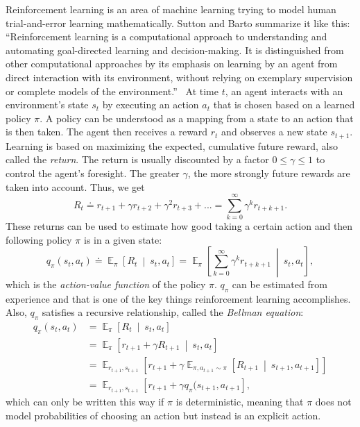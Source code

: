 \documentclass[a4paper,titlepage]{article}
\DeclareMathOperator{\Expectation}{\mathbb{E}}
\newcommand{\Exp}[3]{\Expectation_{#1} \left[ #2 \ \middle| \ #3 \right]}
\newcommand{\Ex}[2]{\Expectation_{#1} \left[ #2 \right]}
\begin{document}
Reinforcement learning is an area of machine learning trying to model human trial-and-error learning mathematically. Sutton and Barto summarize it like this: ``Reinforcement learning is a computational approach to understanding and automating goal-directed learning and decision-making. It is distinguished from other computational approaches by its emphasis on learning by an agent from direct interaction with its environment, without relying on exemplary supervision or complete models of the environment.''~\cite[p.~15]{book} At time $t$, an agent interacts with an environment's state $s_t$ by executing an action $a_t$ that is chosen based on a learned policy $\pi$. A policy can be understood as a mapping from a state to an action that is then taken. The agent then receives a reward $r_t$ and observes a new state $s_{t+1}$. Learning is based on maximizing the expected, cumulative future reward, also called the \emph{return}. The return is usually discounted by a factor $0 \leq \gamma \leq 1$ to control the agent's foresight. The greater $\gamma$, the more strongly future rewards are taken into account. Thus, we get
\begin{equation*}
  R_t \doteq r_{t+1} + \gamma r_{t+2} + \gamma^2 r_{t+3} + ... = \sum_{k = 0}^{\infty} \gamma^k r_{t+k+1}.
\end{equation*}
These returns can be used to estimate how good taking a certain action and then following policy $\pi$ is in a given state:
\begin{equation*}
  q_\pi(s_t, a_t) \doteq \Exp{\pi}{R_t}{s_t, a_t} = \Exp{\pi}{\sum_{k = 0}^{\infty} \gamma^k r_{t+k+1}}{s_t, a_t},
\end{equation*}
which is the \emph{action-value function} of the policy $\pi$.
$q_\pi$ can be estimated from experience and that is one of the key things reinforcement learning accomplishes.
Also, $q_\pi$ satisfies a recursive relationship, called the \emph{Bellman equation}:
\begin{align*}
  q_\pi(s_t, a_t) &= \Exp{\pi}{R_t}{s_t, a_t} \\
  &= \Exp{\pi}{r_{t+1} + \gamma R_{t + 1}}{s_t, a_t} \\
  &= \Ex{r_{t+1}, s_{t+1}}{r_{t+1} + \gamma \Exp{\pi, a_{t+1}\sim\pi}{R_{t+1}}{s_{t+1}, a_{t+1}}} \\
  &= \Ex{r_{t+1}, s_{t+1}}{r_{t+1} + \gamma q_\pi(s_{t+1}, a_{t+1}},
\end{align*}
which can only be written this way if $\pi$ is deterministic, meaning that $\pi$ does not model probabilities of choosing an action but instead is an explicit action.
\end{document}
